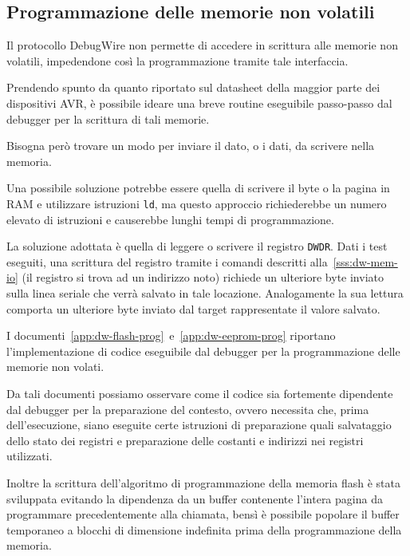 \subsection{Programmazione delle memorie non volatili}

Il protocollo DebugWire non permette di accedere in scrittura alle memorie non volatili, impedendone così la programmazione tramite tale interfaccia.

Prendendo spunto da quanto riportato sul datasheet della maggior parte dei dispositivi AVR\cite[34]{avr:m328p}\cite[sec 26.2.5]{avr:m328p}, è possibile ideare una breve routine eseguibile passo-passo dal debugger per la scrittura di tali memorie.

Bisogna però trovare un modo per inviare il dato, o i dati, da scrivere nella memoria.

Una possibile soluzione potrebbe essere quella di scrivere il byte o la pagina in RAM e utilizzare istruzioni \texttt{ld}, ma questo approccio richiederebbe un numero elevato di  istruzioni e causerebbe lunghi tempi di programmazione.

La soluzione adottata è quella di leggere o scrivere il registro \texttt{DWDR}. Dati i test eseguiti, una scrittura del registro tramite i comandi descritti alla~\cref{sss:dw-mem-io} (il registro si trova ad un indirizzo noto) richiede un ulteriore byte inviato sulla linea seriale che verrà salvato in tale locazione\cite{site:dw-reverse-engeneering}. Analogamente la sua lettura comporta un ulteriore byte inviato dal target rappresentate il valore salvato\cite{site:dw-reverse-engeneering}.

I documenti~\ref{app:dw-flash-prog}~e~\ref{app:dw-eeprom-prog} riportano l'implementazione di codice eseguibile dal debugger per la programmazione delle memorie non volati.

Da tali documenti possiamo osservare come il codice sia fortemente dipendente dal debugger per la preparazione del contesto, ovvero necessita che, prima dell'esecuzione, siano eseguite certe istruzioni di preparazione quali salvataggio dello stato dei registri e preparazione delle costanti e indirizzi nei registri utilizzati.

Inoltre la scrittura dell'algoritmo di programmazione della memoria flash è stata sviluppata evitando la dipendenza da un buffer contenente l'intera pagina da programmare precedentemente alla chiamata, bensì è possibile popolare il buffer temporaneo a blocchi di dimensione indefinita prima della programmazione della memoria.

